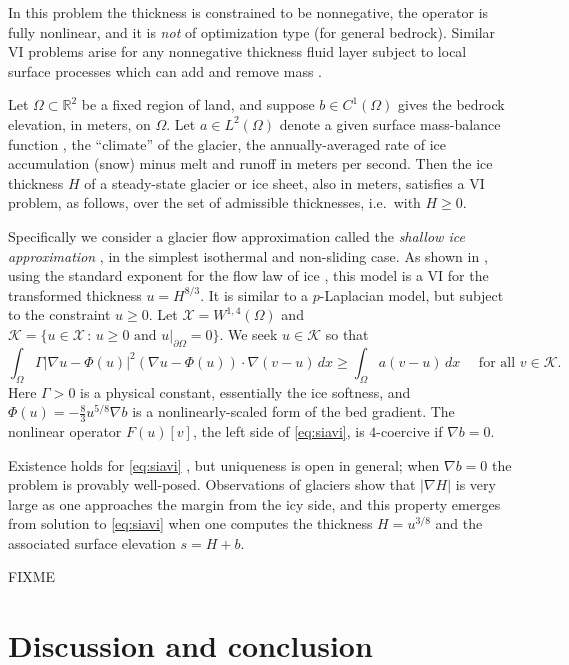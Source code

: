 \documentclass[]{interact}
\theoremstyle{plain}%
\theoremstyle{definition}
\theoremstyle{remark}
\newcommand{\RR}{\mathbb{R}}
\newcommand{\grad}{\nabla}
\newcommand{\cK}{\mathcal{K}}
\newcommand{\cX}{\mathcal{X}}
\begin{document}
In this problem the thickness is constrained to be nonnegative, the operator is fully nonlinear, and it is \emph{not} of optimization type (for general bedrock).  Similar VI problems arise for any nonnegative thickness fluid layer subject to local surface processes which can add and remove mass \cite{Bueler2021b}.

Let $\Omega \subset \RR^2$ be a fixed region of land, and suppose $b \in C^1(\Omega)$ gives the bedrock elevation, in meters, on $\Omega$.  Let $a \in L^2(\Omega)$ denote a given surface mass-balance function \cite{GreveBlatter2009}, the ``climate'' of the glacier, the annually-averaged rate of ice accumulation (snow) minus melt and runoff in meters per second.  Then the ice thickness $H$ of a steady-state glacier or ice sheet, also in meters, satisfies a VI problem, as follows, over the set of admissible thicknesses, i.e.~with $H\ge 0$.

Specifically we consider a glacier flow approximation called the \emph{shallow ice approximation} \cite{GreveBlatter2009}, in the simplest isothermal and non-sliding case.   As shown in \cite{JouvetBueler2012}, using the standard exponent for the flow law of ice \cite{GreveBlatter2009}, this model is a VI for the transformed thickness $u=H^{8/3}$.  It is similar to a $p$-Laplacian model, but subject to the constraint $u\ge 0$.  Let $\cX = W^{1,4}(\Omega)$ and $\cK = \{u \in \cX\,:\,u\ge 0 \text{ and } u|_{\partial\Omega}=0\}$.  We seek $u\in\cK$ so that
\begin{equation}
\int_\Omega \Gamma |\grad u - \Phi(u)|^2 (\grad u - \Phi(u)) \cdot \grad (v-u) \,dx \ge \int_\Omega a (v-u)\,dx \quad \text{ for all } v \in \cK. \label{eq:siavi}
\end{equation}
Here $\Gamma>0$ is a physical constant, essentially the ice softness, and $\Phi(u)=-\frac{8}{3} u^{5/8} \grad b$ is a nonlinearly-scaled form of the bed gradient.  The nonlinear operator $F(u)[v]$, the left side of \eqref{eq:siavi}, is $4$-coercive if $\grad b=0$.

Existence holds for \eqref{eq:siavi} \cite{JouvetBueler2012}, but uniqueness is open in general; when $\grad b=0$ the problem is provably well-posed.  Observations of glaciers show that $|\grad H|$ is very large as one approaches the margin from the icy side, and this property emerges from solution to \eqref{eq:siavi} when one computes the thickness $H=u^{3/8}$ and the associated surface elevation $s=H+b$.

FIXME


\section{Discussion and conclusion} \label{sec:conclusion}
\end{document}

